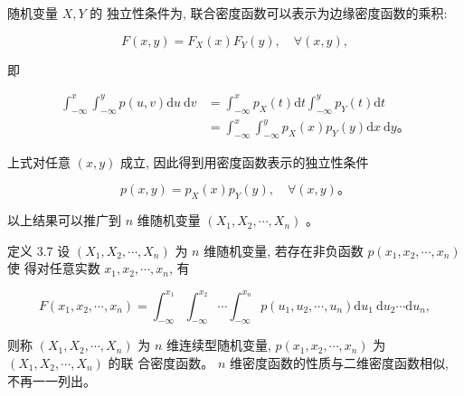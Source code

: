 \documentclass{beamer}
\begin{document}
	\begin{frame}
		随机变量 $X, Y$ 的 独立性条件为, 联合密度函数可以表示为边缘密度函数的乘积:
		
		$$
		F(x, y)=F_{X}(x) F_{Y}(y), \quad \forall(x, y),
		$$
		
		即
		
		$$
		\begin{aligned}
			\int_{-\infty}^{x} \int_{-\infty}^{y} p(u, v) \mathrm{d} u \mathrm{~d} v & =\int_{-\infty}^{x} p_{X}(t) \mathrm{d} t \int_{-\infty}^{y} p_{Y}(t) \mathrm{d} t \\
			& =\int_{-\infty}^{x} \int_{-\infty}^{y} p_{X}(x) p_{Y}(y) \mathrm{d} x \mathrm{~d} y 。
		\end{aligned}
		$$
		
		上式对任意 $(x, y)$ 成立, 因此得到用密度函数表示的独立性条件
		
		$$
		p(x, y)=p_{X}(x) p_{Y}(y), \quad \forall(x, y) 。
		$$
	\end{frame}
	
	\begin{frame}
		以上结果可以推广到 $n$ 维随机变量 $\left(X_{1}, X_{2}, \cdots, X_{n}\right)$ 。 
		
		定义 3.7 设 $\left(X_{1}, X_{2}, \cdots, X_{n}\right)$ 为 $n$ 维随机变量, 若存在非负函数 $p\left(x_{1}, x_{2}, \cdots, x_{n}\right)$ 使 得对任意实数 $x_{1}, x_{2}, \cdots, x_{n}$, 有
		
		$$
		F\left(x_{1}, x_{2}, \cdots, x_{n}\right)=\int_{-\infty}^{x_{1}} \int_{-\infty}^{x_{2}} \cdots \int_{-\infty}^{x_{n}} p\left(u_{1}, u_{2}, \cdots, u_{n}\right) \mathrm{d} u_{1} \mathrm{~d} u_{2} \cdots \mathrm{d} u_{n},
		$$
		
		则称 $\left(X_{1}, X_{2}, \cdots, X_{n}\right)$ 为 $n$ 维连续型随机变量, $p\left(x_{1}, x_{2}, \cdots, x_{n}\right)$ 为 $\left(X_{1}, X_{2}, \cdots, X_{n}\right)$ 的联 合密度函数。 $n$ 维密度函数的性质与二维密度函数相似, 不再一一列出。
	\end{frame}
	
\end{document}

